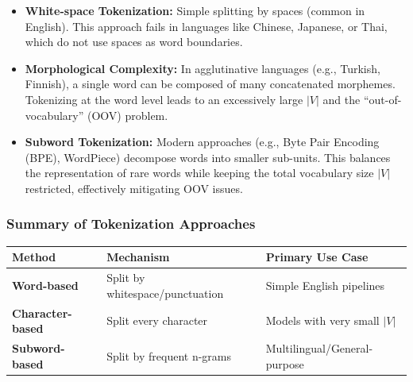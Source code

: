 \documentclass[
  italian,
  11pt,
]{article}
\newcounter{none} %
\providecommand{\tightlist}{%
  \setlength{\itemsep}{0pt}\setlength{\parskip}{0pt}}
\begin{document}
\begin{itemize}
\tightlist
\item
  \textbf{White-space Tokenization:} Simple splitting by spaces (common
  in English). This approach fails in languages like Chinese, Japanese,
  or Thai, which do not use spaces as word boundaries.
\item
  \textbf{Morphological Complexity:} In agglutinative languages (e.g.,
  Turkish, Finnish), a single word can be composed of many concatenated
  morphemes. Tokenizing at the word level leads to an excessively large
  \(|V|\) and the ``out-of-vocabulary'' (OOV) problem.
\item
  \textbf{Subword Tokenization:} Modern approaches (e.g., Byte Pair
  Encoding (BPE), WordPiece) decompose words into smaller sub-units.
  This balances the representation of rare words while keeping the total
  vocabulary size \(|V|\) restricted, effectively mitigating OOV issues.
\end{itemize}

\subsubsection{Summary of Tokenization
Approaches}\label{summary-of-tokenization-approaches}

{\def\LTcaptype{none} %
\begin{longtable}[]{@{}
  >{\raggedright\arraybackslash}p{}
  >{\raggedright\arraybackslash}p{}
  >{\raggedright\arraybackslash}p{}@{}}
\toprule\noalign{}
\begin{minipage}[b]{\linewidth}\raggedright
Method
\end{minipage} & \begin{minipage}[b]{\linewidth}\raggedright
Mechanism
\end{minipage} & \begin{minipage}[b]{\linewidth}\raggedright
Primary Use Case
\end{minipage} \\
\midrule\noalign{}
\endhead
\bottomrule\noalign{}
\endlastfoot
\textbf{Word-based} & Split by whitespace/punctuation & Simple English
pipelines \\
\textbf{Character-based} & Split every character & Models with very
small \(|V|\) \\
\textbf{Subword-based} & Split by frequent n-grams &
Multilingual/General-purpose \\
\end{longtable}
}
\end{document}
